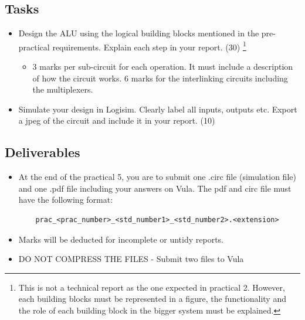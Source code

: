 \subsection{Tasks}
\begin{itemize}
    \item Design the ALU using the logical building blocks mentioned in the pre-practical requirements. Explain each step in your report. (30) \footnote{This is not a technical report as the one expected in practical 2. However, each building blocks must be represented in a figure, the functionality and the role of each building block in the bigger system must be explained.}
    \begin{itemize}
        \item 3 marks per sub-circuit for each operation. It must include a description of how the circuit works. 6 marks for the interlinking circuits including the multiplexers.
    \end{itemize}
    \item Simulate your design in Logisim. Clearly label all inputs, outputs etc. Export a jpeg of the circuit and include it in your report. (10)
\end{itemize}

\subsection{Deliverables}
\begin{itemize}
    \item At the end of the practical 5, you are to submit one .circ file (simulation file) and one .pdf file including your answers on Vula. The pdf and circ file must have the following format:
    \begin{verbatim}
    prac_<prac_number>_<std_number1>_<std_number2>.<extension>    
    \end{verbatim}
    \item Marks will be deducted for incomplete or untidy reports.
    \item DO NOT COMPRESS THE FILES - Submit two files to Vula
\end{itemize}



